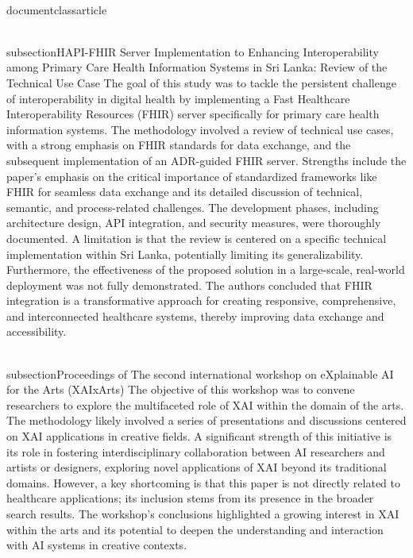 \\documentclass{article}
\begin{document}
\\subsection{HAPI-FHIR Server Implementation to Enhancing Interoperability among Primary Care Health Information Systems in Sri Lanka: Review of the Technical Use Case}
The goal of this study was to tackle the persistent challenge of interoperability in digital health by implementing a Fast Healthcare Interoperability Resources (FHIR) server specifically for primary care health information systems. The methodology involved a review of technical use cases, with a strong emphasis on FHIR standards for data exchange, and the subsequent implementation of an ADR-guided FHIR server. Strengths include the paper's emphasis on the critical importance of standardized frameworks like FHIR for seamless data exchange and its detailed discussion of technical, semantic, and process-related challenges. The development phases, including architecture design, API integration, and security measures, were thoroughly documented. A limitation is that the review is centered on a specific technical implementation within Sri Lanka, potentially limiting its generalizability. Furthermore, the effectiveness of the proposed solution in a large-scale, real-world deployment was not fully demonstrated. The authors concluded that FHIR integration is a transformative approach for creating responsive, comprehensive, and interconnected healthcare systems, thereby improving data exchange and accessibility.

\\subsection{Proceedings of The second international workshop on eXplainable AI for the Arts (XAIxArts)}
The objective of this workshop was to convene researchers to explore the multifaceted role of XAI within the domain of the arts. The methodology likely involved a series of presentations and discussions centered on XAI applications in creative fields. A significant strength of this initiative is its role in fostering interdisciplinary collaboration between AI researchers and artists or designers, exploring novel applications of XAI beyond its traditional domains. However, a key shortcoming is that this paper is not directly related to healthcare applications; its inclusion stems from its presence in the broader search results. The workshop's conclusions highlighted a growing interest in XAI within the arts and its potential to deepen the understanding and interaction with AI systems in creative contexts.
\end{document}
